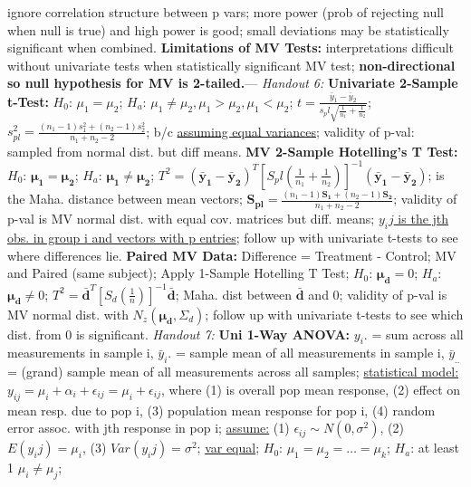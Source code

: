 \documentclass[9pt]{extarticle}
\begin{document}
ignore correlation structure between p vars; more power (prob of rejecting 
null when null is true) and high power is good; small deviations may be
statistically significant when combined.
\textbf{Limitations of MV Tests:} interpretations difficult without univariate
tests when statistically significant MV test; \textbf{non-directional so
null hypothesis for MV is 2-tailed.}---
\textit{Handout 6:}
\textbf{Univariate 2-Sample t-Test:} $H_0$: $\mu_1 = \mu_2$; $H_a$: $\mu_1 
\neq \mu_2, \mu_1 > \mu_2, \mu_1 < \mu_2$; $t = \frac{\bar{y}_1 - \bar{y}_2}
{s_pl\sqrt{\frac{1}{n_1} + \frac{1}{n_2}}}$; $s_{pl}^2 = \frac{(n_1 - 1)s_1^2
+ (n_2 - 1)s_2^2}{n_1 + n_2 - 2}$; b/c \underline{assuming equal variances}; 
validity of p-val: sampled from normal dist. but diff means.
\textbf{MV 2-Sample Hotelling's T Test:} $H_0$: $\boldsymbol{\mu_1} =
\boldsymbol{\mu_2}$; $H_a$: $\boldsymbol{\mu_1} \neq \boldsymbol{\mu_2}$; $T^2 
= (\boldsymbol{\bar{y}_1} - \boldsymbol{\bar{y}_2})^T[S_pl(\frac{1}{n_1} +
\frac{1}{n_2})]^{-1}(\boldsymbol{\bar{y}_1} - \boldsymbol{\bar{y}_2})$; is the 
Maha. distance between mean vectors; $\boldsymbol{S_{pl}} = \frac{(n_1 - 1)
\boldsymbol{S_1} + (n_2 - 1)\boldsymbol{S_2}}{n_1 + n_2 - 2}$; validity of p-val 
is MV normal dist. with equal cov. matrices but diff. means; \underline{$y_ij$ 
is the jth obs. in group i and vectors with p entries}; follow up with univariate
t-tests to see where differences lie.
\textbf{Paired MV Data:} Difference = Treatment - Control; MV and Paired (same
subject); Apply 1-Sample Hotelling T Test; $H_0$: $\boldsymbol{\mu_d} = 0$; 
$H_a$: $\boldsymbol{\mu_d} \neq 0$; $T^2 = 
\boldsymbol{\bar{d}}^T[S_{d}(\frac{1}{n})]^{-1}\boldsymbol{\bar{d}}$; Maha. dist 
between $\boldsymbol{\bar{d}}$ and 0; validity of p-val is MV normal dist. with
$N_z(\boldsymbol{\mu_d}, \Sigma_d)$; follow up with univariate t-tests to see
which dist. from 0 is significant.
\textit{Handout 7:}
\textbf{Uni 1-Way ANOVA:} $y_i.$ = sum across all measurements in sample i, 
$\bar{y}_i.$ = sample mean of all measurements in sample i, $\bar{y}_{..}$ =
(grand) sample mean of all measurements across all samples; \underline{statistical
model:} $y_{ij} = \mu_i + \alpha_i + \epsilon_{ij} = \mu_i + \epsilon_{ij}$, 
where (1) is overall pop mean response, (2) effect on mean resp. due to pop i, 
(3) population mean response for pop i, (4) random error assoc. with jth response 
in pop i; \underline{assume:} (1) $\epsilon_{ij} \sim N(0, \sigma^2)$, (2) 
$E(y_ij) = \mu_i$, (3) $Var(y_ij) = \sigma^2$; \underline{var equal}; $H_0$:
$\mu_1 = \mu_2 = \ldots = \mu_k$; $H_a$: at least 1 $\mu_i \neq \mu_j$; 
\end{document}
